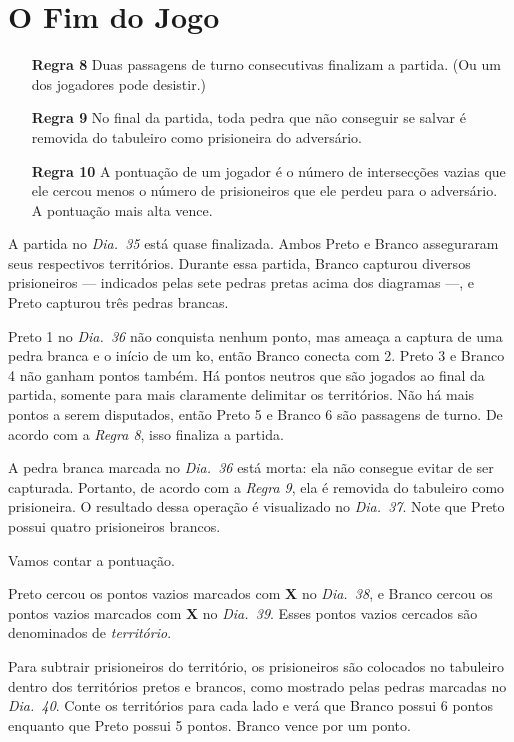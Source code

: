 \chapter{O Fim do Jogo}

\begin{itemize}
    \item[\textbf{Regra 8}] Duas passagens de turno consecutivas finalizam a partida. (Ou um dos jogadores pode desistir.)
    \item[\textbf{Regra 9}] No final da partida, toda pedra que não conseguir se salvar é removida do tabuleiro como prisioneira do adversário.
    \item[\textbf{Regra 10}] A pontuação de um jogador é o número de intersecções vazias que ele cercou menos o número de prisioneiros que ele perdeu para o adversário. A pontuação mais alta vence.
\end{itemize}


A partida no \emph{Dia.\@~35} está quase finalizada. Ambos Preto e Branco asseguraram seus respectivos territórios. Durante essa partida, Branco capturou diversos prisioneiros --- indicados pelas sete pedras pretas acima dos diagramas ---, e Preto capturou três pedras brancas.

Preto 1 no \emph{Dia.\@~36} não conquista nenhum ponto, mas ameaça a captura de uma pedra branca e o início de um ko, então Branco conecta com 2. Preto 3 e Branco 4 não ganham pontos também. Há pontos neutros que são jogados ao final da partida, somente para mais claramente delimitar os territórios. Não há mais pontos a serem disputados, então Preto 5 e Branco 6 são passagens de turno. De acordo com a \emph{Regra 8}, isso finaliza a partida.

A pedra branca marcada no \emph{Dia.\@~36} está morta: ela não consegue evitar de ser capturada. Portanto, de acordo com a \emph{Regra 9}, ela é removida do tabuleiro como prisioneira. O resultado dessa operação é visualizado no \emph{Dia.\@~37}. Note que Preto possui quatro prisioneiros brancos.

Vamos contar a pontuação.

Preto cercou os pontos vazios marcados com \textbf{X} no \emph{Dia.\@~38}, e Branco cercou os pontos vazios marcados com \textbf{X} no \emph{Dia.\@~39}. Esses pontos vazios cercados são denominados de \emph{território}.

Para subtrair prisioneiros do território, os prisioneiros são colocados no tabuleiro dentro dos territórios pretos e brancos, como mostrado pelas pedras marcadas no \emph{Dia.\@~40}. Conte os territórios para cada lado e verá que Branco possui 6 pontos enquanto que Preto possui 5 pontos. Branco vence por um ponto.

